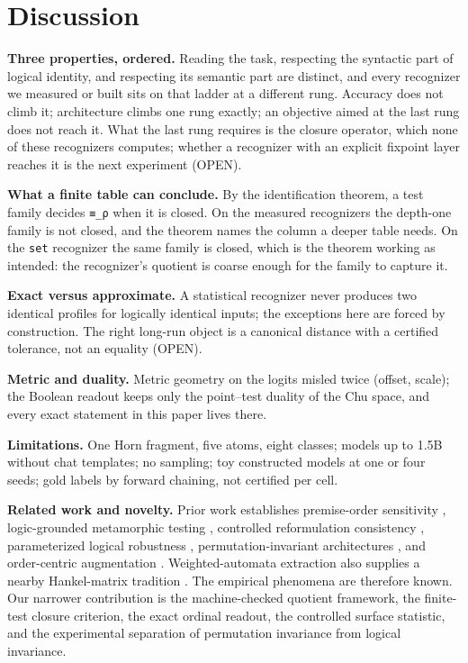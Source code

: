 \hypertarget{discussion}{%
\section{Discussion}\label{discussion}}

\textbf{Three properties, ordered.} Reading the task, respecting the
syntactic part of logical identity, and respecting its semantic part are
distinct, and every recognizer we measured or built sits on that ladder
at a different rung. Accuracy does not climb it; architecture climbs one
rung exactly; an objective aimed at the last rung does not reach it. What
the last rung requires is the closure operator, which none of these
recognizers computes; whether a recognizer with an explicit fixpoint layer
reaches it is the next experiment (OPEN).

\textbf{What a finite table can conclude.} By the identification
theorem, a test family decides \texttt{≡\_ρ} when it is closed. On the
measured recognizers the depth-one family is not closed, and the theorem
names the column a deeper table needs. On the \texttt{set} recognizer
the same family is closed, which is the theorem working as intended: the
recognizer's quotient is coarse enough for the family to capture it.

\textbf{Exact versus approximate.} A statistical recognizer never
produces two identical profiles for logically identical inputs; the
exceptions here are forced by construction. The right long-run object is
a canonical distance with a certified tolerance, not an equality (OPEN).

\textbf{Metric and duality.} Metric geometry on the logits misled twice
(offset, scale); the Boolean readout keeps only the point--test duality
of the Chu space, and every exact statement in this paper lives there.

\textbf{Limitations.} One Horn fragment, five atoms, eight classes;
models up to 1.5B without chat templates; no sampling; toy constructed
models at one or four seeds; gold labels by forward chaining, not
certified per cell.

\textbf{Related work and novelty.} Prior work establishes premise-order
sensitivity \cite{chen2024premise}, logic-grounded metamorphic testing
\cite{zhou2026lgmt}, controlled reformulation consistency
\cite{gu2026crtbench}, parameterized logical robustness
\cite{essebbani2026robustness}, permutation-invariant architectures
\cite{egressy2025setllm}, and order-centric augmentation
\cite{he2025order}. Weighted-automata extraction also supplies a nearby
Hankel-matrix tradition \cite{lacroce2021extracting}. The empirical phenomena
are therefore known. Our narrower contribution is the machine-checked
quotient framework, the finite-test closure criterion, the exact ordinal
readout, the controlled surface statistic, and the experimental separation
of permutation invariance from logical invariance.

